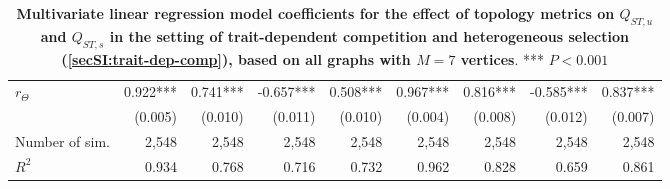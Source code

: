 \begin{table}[ht]
{\begin{tabular}{|l|r|r|r|r|r|r|r|r|}
    $r_\Theta$  &                 0.922*** &                 0.741*** &                -0.657*** &                 0.508*** &                 0.967*** &                 0.816*** &                -0.585*** &                 0.837***\\ 
                &                  (0.005) &                  (0.010) &                  (0.011) &                  (0.010) &                  (0.004) &                  (0.008) &                  (0.012) &                  (0.007)\\ 
    \hline
Number of sim.  &                    2,548 &                    2,548 &                    2,548 &                    2,548 &                    2,548 &                    2,548 &                    2,548 &                    2,548\\ 
    $R^2$       &                    0.934 &                    0.768 &                    0.716 &                    0.732 &                    0.962 &                    0.828 &                    0.659 &                    0.861\\ 
    \hline
    \end{tabular}}
    \caption{ \textbf{Multivariate linear regression model coefficients for the effect of topology metrics on $Q_{ST,u}$ and $Q_{ST,s}$ in the setting of trait-dependent competition and heterogeneous selection (\cref{secSI:trait-dep-comp}), based on all graphs with $M=7$ vertices}.  *** $P < 0.001$}
\label{tableSI:coefficients_trait-dep-comp}
\end{table}

